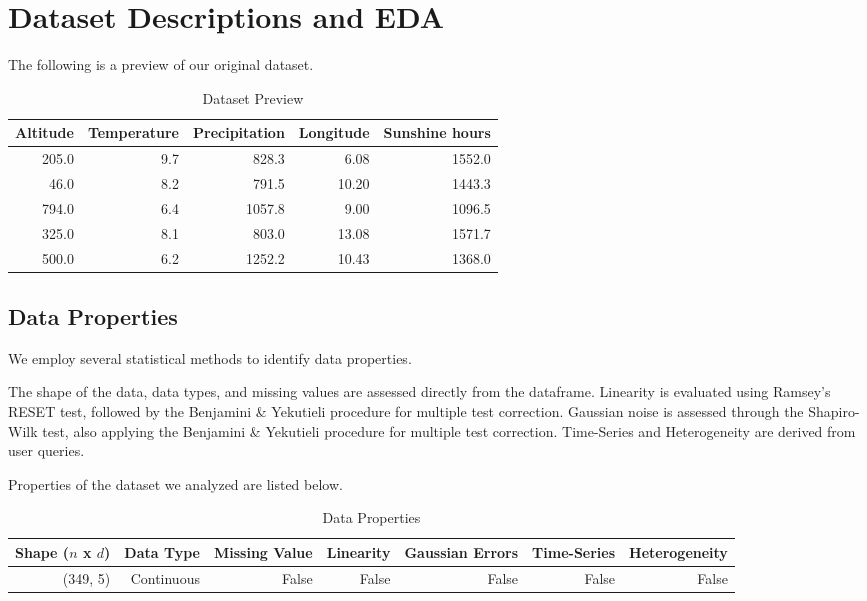 \documentclass{article}
\begin{document}
\section{Dataset Descriptions and EDA}
The following is a preview of our original dataset.

\begin{table}[H]
    \centering
    \caption{Dataset Preview}
    \begin{tabular}{rrrrr}
\toprule
 Altitude &  Temperature &  Precipitation &  Longitude &  Sunshine hours \\
\midrule
    205.0 &          9.7 &          828.3 &       6.08 &          1552.0 \\
     46.0 &          8.2 &          791.5 &      10.20 &          1443.3 \\
    794.0 &          6.4 &         1057.8 &       9.00 &          1096.5 \\
    325.0 &          8.1 &          803.0 &      13.08 &          1571.7 \\
    500.0 &          6.2 &         1252.2 &      10.43 &          1368.0 \\
\bottomrule
\end{tabular}
\end{table}

\subsection{Data Properties}
We employ several statistical methods to identify data properties.

The shape of the data, data types, and missing values are assessed directly from the dataframe. Linearity is evaluated using Ramsey’s RESET test, followed by the Benjamini \& Yekutieli procedure for multiple test correction. Gaussian noise is assessed through the Shapiro-Wilk test, also applying the Benjamini \& Yekutieli procedure for multiple test correction. Time-Series and Heterogeneity are derived from user queries.

Properties of the dataset we analyzed are listed below.

\begin{table}[H]
    \centering
    \caption{Data Properties}
    \begin{tabular}{rrrrrrr}
         \toprule
        Shape ($n$ x $d$) & Data Type & Missing Value & Linearity & Gaussian Errors & Time-Series & Heterogeneity \\
        \midrule
        (349, 5)   & Continuous & False & False & False & False & False \\
        \bottomrule
    \end{tabular}
\end{table}
\end{document}
